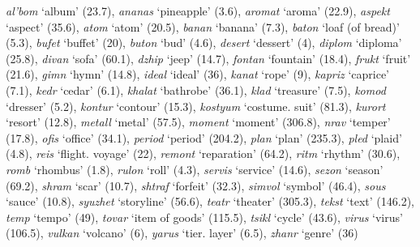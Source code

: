 \documentclass[output=paper, modfonts,newtxmath,hidelinks]{langscibook}
\begin{document}
\noindent\textit{al'bom} `album' (23.7),
\textit{ananas} `pineapple' (3.6),
\textit{aromat} `aroma' (22.9),
\textit{aspekt} `aspect' (35.6),
\textit{atom} `atom' (20.5),
\textit{banan} `banana' (7.3),
\textit{baton} `loaf (of bread)' (5.3),
\textit{bufet} `buffet' (20),
\textit{buton} `bud' (4.6),
\textit{desert} `dessert' (4),
\textit{diplom} `diploma' (25.8),
\textit{divan} `sofa' (60.1),
\textit{dzhip} `jeep' (14.7),
\textit{fontan} `fountain' (18.4),
\textit{frukt} `fruit' (21.6),
\textit{gimn} `hymn' (14.8),
\textit{ideal} `ideal' (36),
\textit{kanat} `rope' (9),
\textit{kapriz} `caprice' (7.1),
\textit{kedr} `cedar' (6.1),
\textit{khalat} `bathrobe' (36.1),
\textit{klad} `treasure' (7.5),
\textit{komod} `dresser' (5.2),
\textit{kontur} `contour' (15.3),
\textit{kostyum} `costume. suit' (81.3),
\textit{kurort} `resort' (12.8),
\textit{metall} `metal' (57.5),
\textit{moment} `moment' (306.8),
\textit{nrav} `temper' (17.8),
\textit{ofis} `office' (34.1),
\textit{period} `period' (204.2),
\textit{plan} `plan' (235.3),
\textit{pled} `plaid' (4.8),
\textit{reis} `flight. voyage' (22),
\textit{remont} `reparation' (64.2),
\textit{ritm} `rhythm' (30.6),
\textit{romb} `rhombus' (1.8),
\textit{rulon} `roll' (4.3),
\textit{servis} `service' (14.6),
\textit{sezon} `season' (69.2),
\textit{shram} `scar' (10.7),
\textit{shtraf} `forfeit' (32.3),
\textit{simvol} `symbol' (46.4),
\textit{sous} `sauce' (10.8),
\textit{syuzhet} `storyline' (56.6),
\textit{teatr} `theater' (305.3),
\textit{tekst} `text' (146.2),
\textit{temp} `tempo' (49),
\textit{tovar} `item of goods' (115.5),
\textit{tsikl} `cycle' (43.6),
\textit{virus} `virus' (106.5),
\textit{vulkan} `volcano' (6),
\textit{yarus} `tier. layer' (6.5),
\textit{zhanr} `genre' (36)
\end{document}
